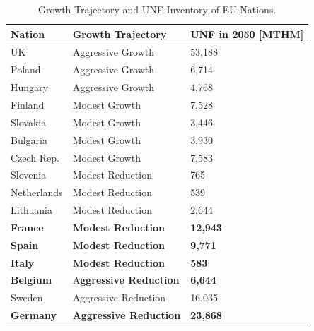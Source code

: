 \begin{frame}
\begin{table}[h]
\begin{adjustbox}{max totalsize={0.8\textwidth}{.8\textheight}, center}
\begin{tabularx}{\textwidth}{lbb}
                    \textbf{Nation} & \textbf{Growth Trajectory} & \small{\textbf{UNF in 2050 [MTHM] }}\\
                    \hline
                    UK & Aggressive Growth & 53,188\\
                    \hline
                    Poland & Aggressive Growth & 6,714\\
                    \hline
                    Hungary & Aggressive Growth & 4,768 \\ 
                    \hline
                    Finland & Modest Growth &  7,528\\
                    \hline
                    Slovakia & Modest Growth & 3,446\\
                    \hline
                    Bulgaria & Modest Growth & 3,930 \\
                    \hline
                    Czech Rep. & Modest Growth & 7,583\\
                    \hline
                    Slovenia & Modest Reduction & 765\\
                    \hline
                    Netherlands & Modest Reduction & 539\\
                    \hline
                    Lithuania & Modest Reduction & 2,644 \\
                    \hline
                    \textbf{France} & \textbf{Modest Reduction} & \textbf{12,943} \\
                    \hline 
                    \textbf{Spain} & \textbf{Modest Reduction} &  \textbf{9,771} \\
                    \hline
                    \textbf{Italy} & \textbf{Modest Reduction} & \textbf{583}\\
                    \hline
                    \textbf{Belgium} & A\textbf{ggressive Reduction} & \textbf{6,644}\\
                    \hline
                    Sweden & Aggressive Reduction & 16,035\\
                    \hline
                    \textbf{Germany} & \textbf{Aggressive Reduction} & \textbf{23,868}\\
                    \hline
                    
                \end{tabularx}
    \end{adjustbox}
    \caption {Growth Trajectory and UNF Inventory of \gls{EU} Nations.}
    \label{tab:which_count}
\end{table}
\end{frame}


